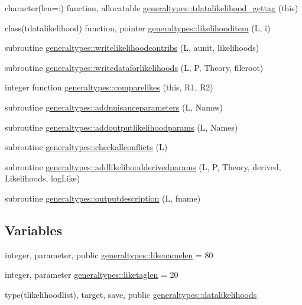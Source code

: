 \begin{DoxyCompactItemize}
character(len=\+:) function, allocatable \mbox{\hyperlink{namespacegeneraltypes_a6578bd73fe17b7b10bb5740695d0fb5f}{generaltypes\+::tdatalikelihood\+\_\+gettag}} (this)
\item 
class(tdatalikelihood) function, pointer \mbox{\hyperlink{namespacegeneraltypes_aaebd3447ba557d8cc1c3f2b5ca98456d}{generaltypes\+::likelihooditem}} (L, i)
\item 
subroutine \mbox{\hyperlink{namespacegeneraltypes_a26624f9233a06ac3e62f6bdb2ad416f8}{generaltypes\+::writelikelihoodcontribs}} (L, aunit, likelihoods)
\item 
subroutine \mbox{\hyperlink{namespacegeneraltypes_af94e150476d45f72d492e761a2d02ab5}{generaltypes\+::writedataforlikelihoods}} (L, P, Theory, fileroot)
\item 
integer function \mbox{\hyperlink{namespacegeneraltypes_aa824e634d28fc4010383a833af894aee}{generaltypes\+::comparelikes}} (this, R1, R2)
\item 
subroutine \mbox{\hyperlink{namespacegeneraltypes_af520b2d286223bb2ce63b94b5c1349b6}{generaltypes\+::addnuisanceparameters}} (L, Names)
\item 
subroutine \mbox{\hyperlink{namespacegeneraltypes_a67700a58507d793526ec1958d512cf71}{generaltypes\+::addoutputlikelihoodparams}} (L, Names)
\item 
subroutine \mbox{\hyperlink{namespacegeneraltypes_a6d294b5c4431a0f7a6537529c66b98f1}{generaltypes\+::checkallconflicts}} (L)
\item 
subroutine \mbox{\hyperlink{namespacegeneraltypes_a785618fc9b8db45522432952253e93a6}{generaltypes\+::addlikelihoodderivedparams}} (L, P, Theory, derived, Likelihoods, log\+Like)
\item 
subroutine \mbox{\hyperlink{namespacegeneraltypes_a99af409a28645f773f5a94f32df68365}{generaltypes\+::outputdescription}} (L, fname)
\end{DoxyCompactItemize}
\subsection*{Variables}
\begin{DoxyCompactItemize}
\item 
integer, parameter, public \mbox{\hyperlink{namespacegeneraltypes_ace8a6f4c868858b72f97b45b87312845}{generaltypes\+::likenamelen}} = 80
\item 
integer, parameter \mbox{\hyperlink{namespacegeneraltypes_aa0157fd48eed0fc43695836a0c19e1f0}{generaltypes\+::liketaglen}} = 20
\item 
type(tlikelihoodlist), target, save, public \mbox{\hyperlink{namespacegeneraltypes_a2e2a79dda657e0a8910f724be0015ed5}{generaltypes\+::datalikelihoods}}
\end{DoxyCompactItemize}
